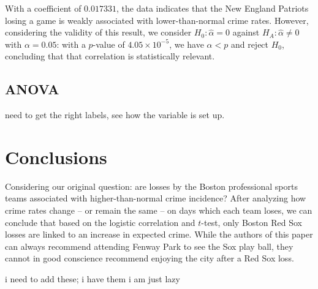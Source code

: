 \documentclass{article}
\begin{document}
With a coefficient of $0.017331$, the data indicates that the New England Patriots losing a game is weakly associated with lower-than-normal crime rates. However, considering the validity of this result, we consider $H_0: \hat{\alpha} = 0$ against $H_A: \hat{\alpha} \neq 0$ with $\alpha = 0.05$: with a $p$-value of $4.05\times10^{-5}$, we have $\alpha < p$ and reject $H_0$, concluding that that correlation is statistically relevant. 

\subsection{ANOVA}
need to get the right labels, see how the variable is set up. 
\section{Conclusions}
Considering our original question: are losses by the Boston professional sports teams associated with higher-than-normal crime incidence? After analyzing how crime rates change -- or remain the same -- on days which each team loses, we can conclude that based on the logistic correlation and $t$-test, only Boston Red Sox losses are linked to an increase in expected crime. While the authors of this paper can always recommend attending Fenway Park to see the Sox play ball, they cannot in good conscience recommend enjoying the city after a Red Sox loss.

\begin{thebibliography}{99}
i need to add these; i have them i am just lazy 
\end{thebibliography}
\end{document}
